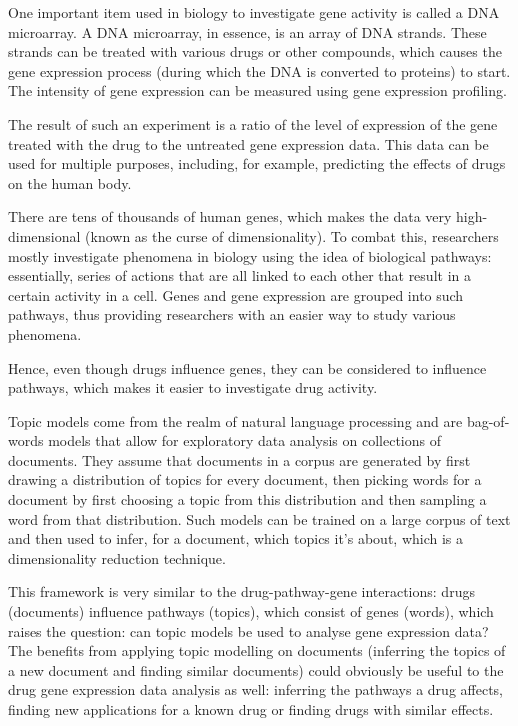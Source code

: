 \documentclass[12pt,a4paper,twoside,openright]{report}
\begin{document}
One important item used in biology to investigate gene activity is called a DNA microarray. A DNA microarray, in essence, is an array of DNA strands. These strands can be treated with various drugs or other compounds, which causes the gene expression process (during which the DNA is converted to proteins) to start. The intensity of gene expression can be measured using gene expression profiling.

The result of such an experiment is a ratio of the level of expression of the gene treated with the drug to the untreated gene expression data. This data can be used for multiple purposes, including, for example, predicting the effects of drugs on the human body.

There are tens of thousands of human genes, which makes the data very high-dimensional (known as the curse of dimensionality). To combat this, researchers mostly investigate phenomena in biology using the idea of biological pathways: essentially, series of actions that are all linked to each other that result in a certain activity in a cell. Genes and gene expression are grouped into such pathways, thus providing researchers with an easier way to study various phenomena.

Hence, even though drugs influence genes, they can be considered to influence pathways, which makes it easier to investigate drug activity.

Topic models come from the realm of natural language processing and are bag-of-words models that allow for exploratory data analysis on collections of documents. They assume that documents in a corpus are generated by first drawing a distribution of topics for every document, then picking words for a document by first choosing a topic from this distribution and then sampling a word from that distribution. Such models can be trained on a large corpus of text and then used to infer, for a document, which topics it's about, which is a dimensionality reduction technique.

This framework is very similar to the drug-pathway-gene interactions: drugs (documents) influence pathways (topics), which consist of genes (words), which raises the question: can topic models be used to analyse gene expression data? The benefits from applying topic modelling on documents (inferring the topics of a new document and finding similar documents) could obviously be useful to the drug gene expression data analysis as well: inferring the pathways a drug affects, finding new applications for a known drug or finding drugs with similar effects.
\end{document}
